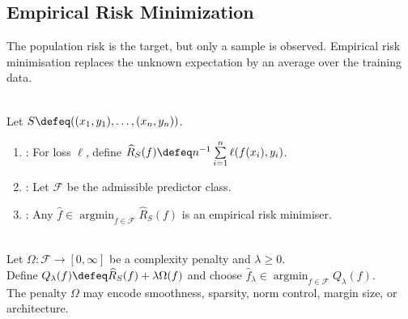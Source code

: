 \subsection{Empirical Risk Minimization}

The population risk is the target, but only a sample is observed.  Empirical risk minimisation replaces the unknown expectation by an average over the training data.

\begin{definition} \label{def:sl-empirical-risk-minimization} \\
Let $S\defeq((x_1,y_1),\ldots,(x_n,y_n))$.
\begin{enumerate}[label=(\roman*)]
\setlength{\itemsep}{0pt}
\item {}: For loss $\ell$, define $\widehat{R}_S(f)\defeq n^{-1}\sum\limits_{i=1}^n\ell(f(x_i),y_i)$.
\item {}: Let $\mathcal{F}$ be the admissible predictor class.
\item {}: Any $\widehat{f}\in\operatorname*{argmin}_{f\in\mathcal{F}}\widehat{R}_S(f)$ is an empirical risk minimiser.
\end{enumerate}
\end{definition}

\begin{definition} \label{def:sl-regularized-erm} \\
Let $\Omega:\mathcal{F}\to[0,\infty]$ be a complexity penalty and $\lambda\geq0$.\\
Define $Q_\lambda(f)\defeq\widehat{R}_S(f)+\lambda\Omega(f)$ and choose $\widehat{f}_\lambda\in\operatorname*{argmin}_{f\in\mathcal{F}}Q_\lambda(f)$.\\
The penalty $\Omega$ may encode smoothness, sparsity, norm control, margin size, or architecture.
\end{definition}

